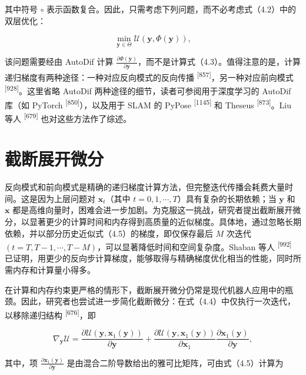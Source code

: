 其中符号 $\circ$ 表示函数复合。因此，只需考虑下列问题，而不必考虑式（4.2）中的双层优化：

\begin{equation}
\min _ {\boldsymbol {y} \in \Theta} \mathcal {U} (\boldsymbol {y}, \Phi (\boldsymbol {y})),\tag{4.7}
\end{equation}

该问题需要经由 AutoDif 计算 $\frac { \partial \Phi ( \pmb { y } ) } { \partial \pmb { y } }$，而不是计算式（4.3）。值得注意的是，计算递归梯度有两种途径：一种对应反向模式的反向传播 \textsuperscript{[857]}，另一种对应前向模式 \textsuperscript{[928]}。这里省略 AutoDif 两种途径的细节，读者可参阅用于深度学习的 AutoDif 库（如 PyTorch \textsuperscript{[850]}），以及用于 SLAM 的 PyPose \textsuperscript{[1145]} 和 Theseus \textsuperscript{[873]}。Liu 等人 \textsuperscript{[679]} 也对这些方法作了综述。

\section{截断展开微分}

反向模式和前向模式是精确的递归梯度计算方法，但完整迭代传播会耗费大量时间。这是因为上层问题对 $\pmb{x}_t$（其中 $t = 0, 1, \cdots, T$）具有复杂的长期依赖；当 $\pmb{y}$ 和 $\pmb{x}$ 都是高维向量时，困难会进一步加剧。为克服这一挑战，研究者提出截断展开微分，以显著更少的计算时间和内存得到高质量的近似梯度。具体地，通过忽略长期依赖，并以部分历史近似式（4.5）的梯度，即仅保存最后 $M$ 次迭代 $(t = T, T - 1, \cdots, T - M)$，可以显著降低时间和空间复杂度。Shaban 等人 \textsuperscript{[992]} 已证明，用更少的反向步计算梯度，能够取得与精确梯度优化相当的性能，同时所需内存和计算量小得多。

在计算和内存约束更严格的情形下，截断展开微分仍常是现代机器人应用中的瓶颈。因此，研究者也尝试进一步简化截断微分：在式（4.4）中仅执行一次迭代，以移除递归结构 \textsuperscript{[676]}，即

\begin{equation}
\nabla_ {\boldsymbol {y}} \mathcal {U} = \frac {\partial \mathcal {U} (\boldsymbol {y} , \boldsymbol {x} _ {1} (\boldsymbol {y}))}{\partial \boldsymbol {y}} + \frac {\partial \mathcal {U} (\boldsymbol {y} , \boldsymbol {x} _ {1} (\boldsymbol {y}))}{\partial \boldsymbol {x} _ {1}} \frac {\partial \boldsymbol {x} _ {1} (\boldsymbol {y})}{\partial \boldsymbol {y}},\tag{4.8}
\end{equation}

其中，项 $\frac{\partial \pmb{x}_1(\pmb{y})}{\partial \pmb{y}}$ 是由混合二阶导数给出的雅可比矩阵，可由式（4.5）计算为

